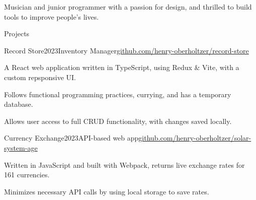 \documentclass[
	11pt, %
]{resume} %
\begin{document}

\begin{flushleft}
	Musician and junior programmer with a passion for design, and thrilled to build tools to improve people's lives. \hfill
\end{flushleft}

\begin{rSection}{Projects}
	\begin{rSubsection}{Record Store}{2023}{Inventory Manager}{\href{https://github.com/henry-oberholtzer/record-store}{github.com/henry-oberholtzer/record-store}}
		\item A React web application written in TypeScript, using Redux \& Vite, with a custom repsponsive UI.
		\item Follows functional programming practices, currying, and has a temporary database.
		\item Allows user access to full CRUD functionality, with changes saved locally.
	\end{rSubsection}
	\begin{rSubsection}{Currency Exchange}{2023}{API-based web app}{\href{https://github.com/henry-oberholtzer/solar-system-age}{github.com/henry-oberholtzer/solar-system-age}}
		\item Written in JavaScript and built with Webpack, returns live exchange rates for 161 currencies.
		\item Minimizes necessary API calls by using local storage to save rates.
	\end{rSubsection}
\end{rSection}
\end{document}
